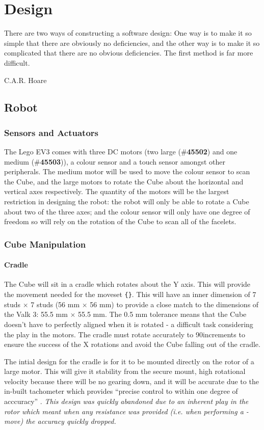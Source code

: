 \documentclass{report}
\newcommand{\tbo}[1]{\textbf{#1}}
\newcommand{\tit}[1]{\textit{#1}}
\newcommand{\legopiece}[1]{(\#\tbo{#1})}
\newcommand{\moveset}[1]{\uppercase{\texttt{\{\formatmoves{#1}\}}}}
\newcommand{\move}[1]{\uppercase{\texttt{\formatmovesnospace{#1}}}-move}
\begin{document}
    \newpage
    \chapter{Design}
    \epigraph{There are two ways of constructing a software design: One way is to make it so simple that there are obviously no deficiencies, and the other way is to make it so complicated that there are no obvious deficiencies. The first method is far more difficult.}{C.A.R. Hoare\cite{Hoare1981}}
    \section{Robot}
    \subsection{Sensors and Actuators}
    The Lego EV3 comes with three DC motors (two large \legopiece{45502} and one medium \legopiece{45503}), a colour sensor and a touch sensor amongst other peripherals. The medium motor will be used to move the colour sensor to scan the Cube, and the large motors to rotate the Cube about the horizontal and vertical axes respectively. The quantity of the motors will be the largest restriction in designing the robot: the robot will only be able to rotate a Cube about two of the three axes; and the colour sensor will only have one degree of freedom so will rely on the rotation of the Cube to scan all of the facelets.
    
    \subsection{Cube Manipulation}
    \subsubsection{Cradle}
    The Cube will sit in a cradle which rotates about the Y axis. This will provide the movement needed for the moveset \moveset{Y.Y'y2D.D'd2}. This will have an inner dimension of 7 studs $\times$ 7 studs (56 mm $\times$ 56 mm) to provide a close match to the dimensions of the Valk 3: 55.5 mm $\times$ 55.5 mm. The 0.5 mm tolerance means that the Cube doesn't have to perfectly aligned when it is rotated - a difficult task considering the play in the motors. The cradle must rotate accurately to 90\degree increments to ensure the success of the X rotations and avoid the Cube falling out of the cradle. 
    
	The intial design for the cradle is for it to be mounted directly on the rotor of a large motor. This will give it stability from the secure mount, high rotational velocity because there will be no gearing down, and it will be accurate due to the in-built tachometer which provides \enquote{precise control to within one degree of acccuracy} \cite{lego}. \tit{This design was quickly abandoned due to an inherent play in the rotor which meant when any resistance was provided (i.e. when performing a \move{D}) the accuracy quickly dropped.}
	
\end{document}
